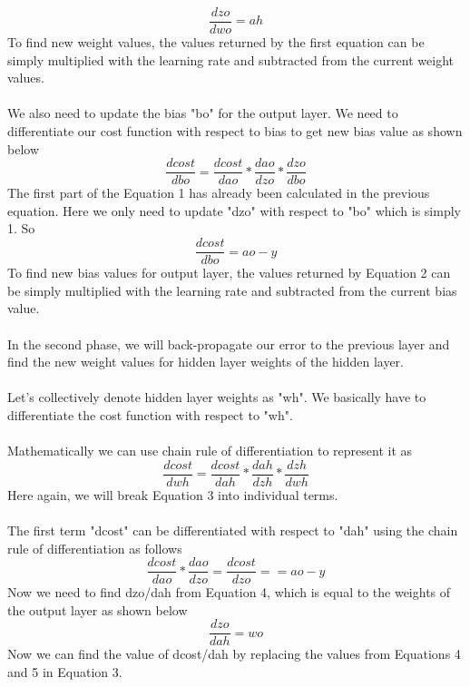 \documentclass[11pt]{article}
\theoremstyle{definition}
\begin{document}
$$
\frac{dzo}{dwo}=ah
$$
To find new weight values, the values returned by the first equation can be simply multiplied with the learning rate and subtracted from the current weight values.\\\\
We also need to update the bias "bo" for the output layer. We need to differentiate our cost function with respect to bias to get new bias value as shown below
\begin{equation}
\frac{dcost}{dbo}=\frac{dcost}{dao}*\frac{dao}{dzo}*\frac{dzo}{dbo}
\end{equation}
The first part of the Equation 1 has already been calculated in the previous equation. Here we only need to update "dzo" with respect to "bo" which is simply 1. So
\begin{equation}
\frac{dcost}{dbo}=ao-y
\end{equation}
To find new bias values for output layer, the values returned by Equation 2 can be simply multiplied with the learning rate and subtracted from the current bias value.\\\\
In the second phase, we will back-propagate our error to the previous layer and find the new weight values for hidden layer weights of the hidden layer.\\\\
Let's collectively denote hidden layer weights as "wh". We basically have to differentiate the cost function with respect to "wh".\\\\
Mathematically we can use chain rule of differentiation to represent it as
\begin{equation}
\frac{dcost}{dwh}=\frac{dcost}{dah}*\frac{dah}{dzh}*\frac{dzh}{dwh}
\end{equation}
Here again, we will break Equation 3 into individual terms.\\\\
The first term "dcost" can be differentiated with respect to "dah" using the chain rule of differentiation as follows
\begin{equation}
\frac{dcost}{dao}*\frac{dao}{dzo}=\frac{dcost}{dzo}==ao-y
\end{equation}
Now we need to find dzo/dah from Equation 4, which is equal to the weights of the output layer as shown below
\begin{equation}
\frac{dzo}{dah}=wo
\end{equation}
Now we can find the value of dcost/dah by replacing the values from Equations 4 and 5 in Equation 3.\\\\
\end{document}
